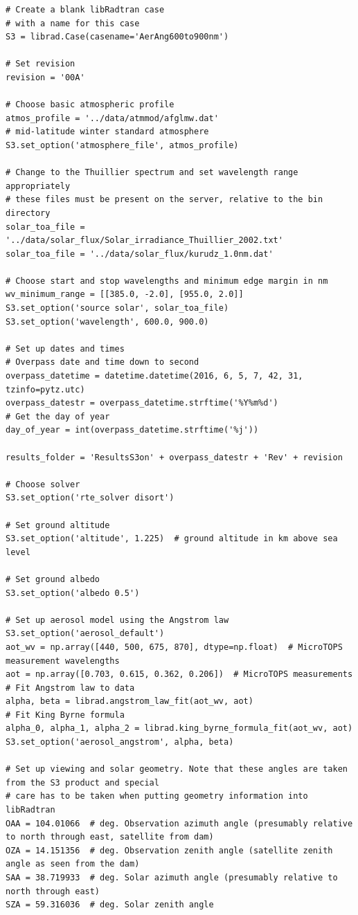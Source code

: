 \begin{lstlisting}[style=tinysize]
# Create a blank libRadtran case
# with a name for this case
S3 = librad.Case(casename='AerAng600to900nm')

# Set revision
revision = '00A'

# Choose basic atmospheric profile
atmos_profile = '../data/atmmod/afglmw.dat'
# mid-latitude winter standard atmosphere
S3.set_option('atmosphere_file', atmos_profile)  

# Change to the Thuillier spectrum and set wavelength range appropriately
# these files must be present on the server, relative to the bin directory
solar_toa_file = '../data/solar_flux/Solar_irradiance_Thuillier_2002.txt'
solar_toa_file = '../data/solar_flux/kurudz_1.0nm.dat'

# Choose start and stop wavelengths and minimum edge margin in nm
wv_minimum_range = [[385.0, -2.0], [955.0, 2.0]]
S3.set_option('source solar', solar_toa_file)
S3.set_option('wavelength', 600.0, 900.0)

# Set up dates and times
# Overpass date and time down to second
overpass_datetime = datetime.datetime(2016, 6, 5, 7, 42, 31, tzinfo=pytz.utc)  
overpass_datestr = overpass_datetime.strftime('%Y%m%d')
# Get the day of year
day_of_year = int(overpass_datetime.strftime('%j'))

results_folder = 'ResultsS3on' + overpass_datestr + 'Rev' + revision

# Choose solver
S3.set_option('rte_solver disort')

# Set ground altitude
S3.set_option('altitude', 1.225)  # ground altitude in km above sea level

# Set ground albedo
S3.set_option('albedo 0.5')

# Set up aerosol model using the Angstrom law
S3.set_option('aerosol_default')
aot_wv = np.array([440, 500, 675, 870], dtype=np.float)  # MicroTOPS measurement wavelengths
aot = np.array([0.703, 0.615, 0.362, 0.206])  # MicroTOPS measurements
# Fit Angstrom law to data
alpha, beta = librad.angstrom_law_fit(aot_wv, aot)
# Fit King Byrne formula
alpha_0, alpha_1, alpha_2 = librad.king_byrne_formula_fit(aot_wv, aot)
S3.set_option('aerosol_angstrom', alpha, beta)

# Set up viewing and solar geometry. Note that these angles are taken from the S3 product and special
# care has to be taken when putting geometry information into libRadtran
OAA = 104.01066  # deg. Observation azimuth angle (presumably relative to north through east, satellite from dam)
OZA = 14.151356  # deg. Observation zenith angle (satellite zenith angle as seen from the dam)
SAA = 38.719933  # deg. Solar azimuth angle (presumably relative to north through east)
SZA = 59.316036  # deg. Solar zenith angle


\end{lstlisting}
